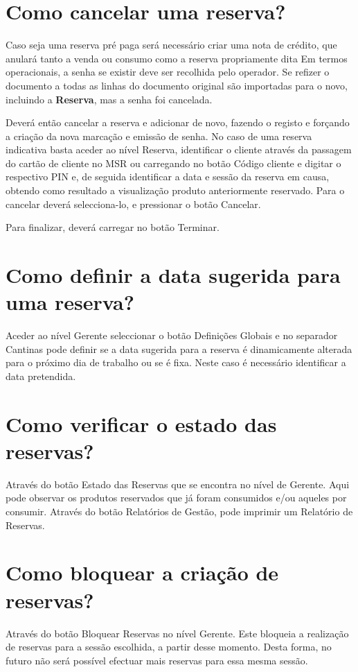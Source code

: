 \documentclass[a4paper,11pt,openany]{memoir}
\begin{document}
\section{Como cancelar uma reserva?}
Caso seja uma reserva pré paga será necessário criar uma nota de crédito, que
anulará tanto a venda ou consumo como a reserva propriamente dita Em termos
operacionais, a senha se existir deve ser recolhida pelo operador. Se refizer o
documento a todas as linhas do documento original são importadas para o novo,
incluindo a \textbf{Reserva}, mas a senha foi cancelada.

Deverá então cancelar a reserva
e adicionar de novo, fazendo o registo e forçando a criação da nova marcação e
emissão de senha. No caso de uma reserva indicativa basta aceder ao nível
Reserva, identificar o cliente através da passagem do cartão de cliente no MSR ou
carregando no botão Código cliente e digitar o respectivo PIN e, de seguida
identificar a data e sessão da reserva em causa, obtendo como resultado a
visualização produto anteriormente reservado. Para o cancelar deverá selecciona-lo,
e pressionar o botão Cancelar. 

Para finalizar, deverá carregar no botão Terminar.

\section{Como definir a data sugerida para uma reserva?}
Aceder ao nível Gerente seleccionar o botão Definições Globais e no separador
Cantinas pode definir se a data sugerida para a reserva é dinamicamente alterada
para o próximo dia de trabalho ou se é fixa. Neste caso é necessário identificar a
data pretendida.

\section{Como verificar o estado das reservas?}
Através do botão Estado das Reservas que se encontra no nível de Gerente. Aqui
pode observar os produtos reservados que já foram consumidos e/ou aqueles por
consumir. Através do botão Relatórios de Gestão, pode imprimir um Relatório de
Reservas.

\section{Como bloquear a criação de reservas?}
Através do botão Bloquear Reservas no nível Gerente. Este bloqueia a realização de
reservas para a sessão escolhida, a partir desse momento. Desta forma, no futuro
não será possível efectuar mais reservas para essa mesma sessão.
\end{document}
